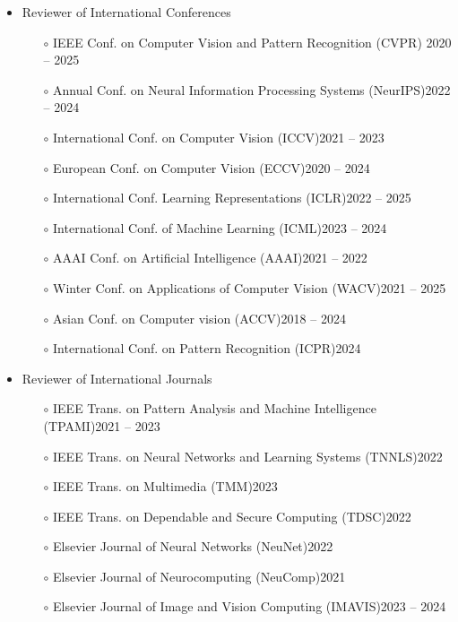 \documentclass[10pt,margin,line,pifont,palatino,courier]{res}
\begin{document}
\begin{resume}
\begin{itemize}[leftmargin=*]
\item Reviewer of International Conferences
	\begin{itemize}[noitemsep, leftmargin=*]
		\item[$\circ$] IEEE Conf. on Computer Vision and Pattern Recognition (CVPR) \hfill 2020 -- 2025
		\item[$\circ$] Annual Conf. on Neural Information Processing Systems (NeurIPS)\hfill 2022 -- 2024
		\item[$\circ$] International Conf. on Computer Vision (ICCV)\hfill 2021 -- 2023
		\item[$\circ$] European Conf. on Computer Vision (ECCV)\hfill 2020 -- 2024
		\item[$\circ$] International Conf. Learning Representations (ICLR)\hfill 2022 -- 2025
		\item[$\circ$] International Conf. of Machine Learning (ICML)\hfill 2023 -- 2024
		\item[$\circ$] AAAI Conf. on Artificial Intelligence (AAAI)\hfill 2021 -- 2022
		\item[$\circ$] Winter Conf. on Applications of Computer Vision (WACV)\hfill 2021 -- 2025
		\item[$\circ$] Asian Conf. on Computer vision (ACCV)\hfill 2018 -- 2024
        \item[$\circ$] International Conf. on Pattern Recognition (ICPR)\hfill 2024
	\end{itemize}
\item Reviewer of International Journals
	\begin{itemize}[noitemsep, leftmargin=*]
		\item[$\circ$] IEEE Trans. on Pattern Analysis and Machine Intelligence (TPAMI)\hfill 2021 -- 2023
        \item[$\circ$] IEEE Trans. on Neural Networks and Learning Systems (TNNLS)\hfill 2022
        \item[$\circ$] IEEE Trans. on Multimedia (TMM)\hfill 2023
        \item[$\circ$] IEEE Trans. on Dependable and Secure Computing (TDSC)\hfill 2022
        \item[$\circ$] Elsevier Journal of Neural Networks (NeuNet)\hfill 2022
        \item[$\circ$] Elsevier Journal of Neurocomputing (NeuComp)\hfill 2021
        \item[$\circ$] Elsevier Journal of Image and Vision Computing (IMAVIS)\hfill 2023 -- 2024

\end{itemize}
\end{itemize}
\end{resume}
\end{document}
